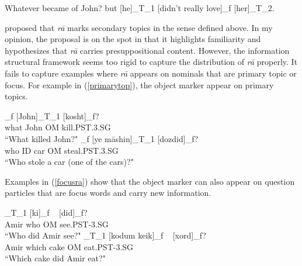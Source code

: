 \documentclass[12pt]{article}
\begin{document}
			\begin {exe}
				\ex \label{topicexe}
				\begin {xlist}
					\ex Whatever became of John? \hfill {\scriptsize \citep{dalrymple2011objects}}
					\ex but [he]_{T_1} [didn't really love]_f [her]_{T_2}.
				\end {xlist}
			\end {exe}

\cite{dabir1992dependence} proposed that \emph{r\={a}} marks secondary topics in the sense defined above. In my opinion, the proposal is on the spot in that it highlights familiarity and hypothesizes that \emph{r\={a}} carries presuppositional content. However, the information structural framework seems too rigid to capture the distribution of \emph{r\={a}} properly. It fails to capture examples where \emph{r\={a}} appears on nominals that are primary topic or focus. For example in (\ref{primarytop}), the object marker appear on primary topics. 

			\begin {exe}
				\ex \label {primarytop}
					\begin {xlist}
					\ex \gll	[Chi]_f [John]_{T_1} \fbox{o} [kosht]_f?\\
							what John {\scriptsize OM} kill.{\scriptsize PST.3.SG}\\
						\glt	``What killed John?"
					\ex \gll	[Ki]_f [ye m\={a}shin]_{T_1} \fbox{o} [dozdid]_f?\\
							who {\scriptsize ID} car {\scriptsize OM} steal.{\scriptsize PST.3.SG}\\
						\glt	``Who stole a car (one of the cars)?"
				\end {xlist}
			\end {exe}

Examples in (\ref{focusra}) show that the object marker can also appear on question particles that are focus words and carry new information.

			\begin {exe}
				\ex \label {focusra}
					\begin {xlist}
					\ex \gll	[Amir]_{T_1} [ki]_f ~\fbox{ro} [did]_f?\\
							Amir who {\scriptsize OM} see.{\scriptsize PST-3.SG}\\
						\glt	``Who did Amir see?"
					\ex \gll	[Amir]_{T_1} [kodum keik]_f ~\fbox{o} [xord]_f?\\
							Amir which cake {\scriptsize OM} eat.{\scriptsize PST-3.SG}\\
						\glt	``Which cake did Amir eat?"\\
				\end {xlist}
			\end {exe}
\end{document}

